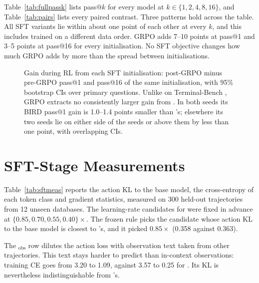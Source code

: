 Table~\ref{tab:fullpassk} lists pass@$k$ for every model at $k\in\{1,2,4,8,16\}$, and Table~\ref{tab:pairs} lists every paired contrast. Three patterns hold across the table. All SFT variants lie within about one point of each other at every $k$, and this includes \armA{} trained on a different data order. GRPO adds 7--10 points at pass@1 and 3--5 points at pass@16 for every initialisation. No SFT objective changes how much GRPO adds by more than the spread between initialisations.




\begin{figure}[h]
\centering
{}
\caption{Gain during RL from each SFT initialisation: post-GRPO minus pre-GRPO pass@1 and pass@16 of the same initialisation, with 95\% bootstrap CIs over primary questions. Unlike on Terminal-Bench \citep{zhang2026actobs}, GRPO extracts no consistently larger gain from \armB{}. In both seeds its BIRD pass@1 gain is 1.0--1.4 points smaller than \armA's; elsewhere its two seeds lie on either side of the \armA{} seeds or above them by less than one point, with overlapping CIs.}
\label{fig:rlgain}
\end{figure}

\section{SFT-Stage Measurements}
\label{app:sft}

Table~\ref{tab:sftmeas} reports the action KL to the base model, the cross-entropy of each token class and gradient statistics, measured on 300 held-out trajectories from 12 unseen databases. The learning-rate candidates for \armC{} were fixed in advance at $\{0.85, 0.70, 0.55, 0.40\}\times$. The frozen rule picks the candidate whose action KL to the base model is closest to \armB's, and it picked $0.85\times$ (0.358 against 0.363).

The \armD$_{\text{obs}}$ row dilutes the action loss with observation text taken from other trajectories. This text stays harder to predict than in-context observations: training CE goes from 3.20 to 1.09, against 3.57 to 0.25 for \armB{}. Its KL is nevertheless indistinguishable from \armC's.

